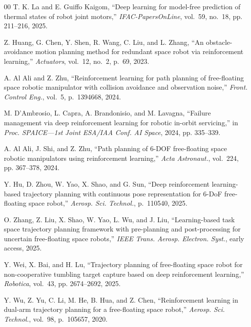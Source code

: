 \documentclass{ieeeaccess}
\begin{document}
\begin{thebibliography}{00}
T. K. La and E. Guiffo Kaigom, ``Deep learning for model-free prediction of thermal states of
robot joint motors,'' \emph{IFAC-PapersOnLine}, vol.~59, no.~18, pp. 211--216, 2025.

 Z. Huang, G. Chen, Y. Shen, R. Wang, C. Liu, and L. Zhang, ``An
obstacle-avoidance motion planning method for redundant space robot via reinforcement learning,''
\emph{Actuators}, vol.~12, no.~2, p.~69, 2023.



 A. Al Ali and Z. Zhu, ``Reinforcement learning for path planning of
free-floating space robotic manipulator with collision avoidance and observation noise,'' \emph{Front.
Control Eng.}, vol.~5, p.~1394668, 2024.



M. D'Ambrosio, L. Capra, A. Brandonisio, and M. Lavagna, ``Failure management via deep reinforcement
learning for robotic in-orbit servicing,'' in \emph{Proc. SPAICE---1st Joint ESA/IAA Conf. AI Space}, 2024,
pp. 335--339.



A. Al Ali, J. Shi, and Z. Zhu, ``Path planning of 6-DOF free-floating space
robotic manipulators using reinforcement learning,'' \emph{Acta Astronaut.}, vol.~224, pp. 367--378, 2024.



 Y. Hu, D. Zhou, W. Yao, X. Shao, and G. Sun, ``Deep reinforcement learning-based
trajectory planning with continuous pose representation for 6-DoF free-floating space robot,''
\emph{Aerosp. Sci. Technol.}, p.~110540, 2025.



 O. Zhang, Z. Liu, X. Shao, W. Yao, L. Wu, and J. Liu, ``Learning-based task
space trajectory planning framework with pre-planning and post-processing for uncertain free-floating
space robots,'' \emph{IEEE Trans. Aerosp. Electron. Syst.}, early access, 2025.



 Y. Wei, X. Bai, and H. Lu, ``Trajectory planning of free-floating space robot
for non-cooperative tumbling target capture based on deep reinforcement learning,'' \emph{Robotica},
vol.~43, pp. 2674--2692, 2025.



Y. Wu, Z. Yu, C. Li, M. He, B. Hua, and Z. Chen, ``Reinforcement
learning in dual-arm trajectory planning for a free-floating space robot,'' \emph{Aerosp. Sci. Technol.}, vol.~98,
p.~105657, 2020.




\end{thebibliography}
\end{document}

